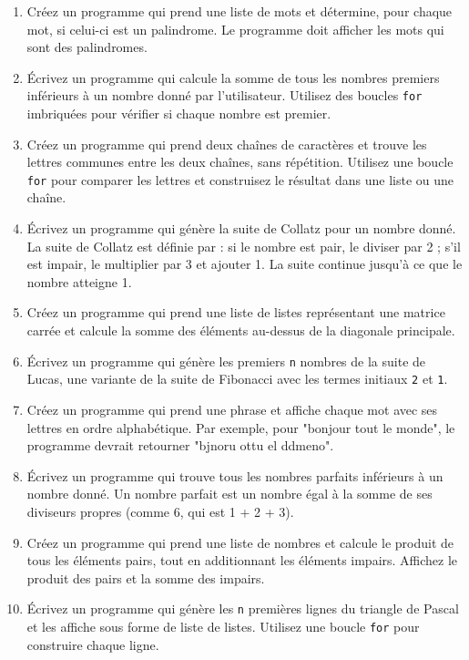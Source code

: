 \begin{enumerate}

    \item Créez un programme qui prend une liste de mots et détermine, pour chaque mot, si celui-ci est un palindrome. Le programme doit afficher les mots qui sont des palindromes.

    \item Écrivez un programme qui calcule la somme de tous les nombres premiers inférieurs à un nombre donné par l'utilisateur. Utilisez des boucles \texttt{for} imbriquées pour vérifier si chaque nombre est premier.

    \item Créez un programme qui prend deux chaînes de caractères et trouve les lettres communes entre les deux chaînes, sans répétition. Utilisez une boucle \texttt{for} pour comparer les lettres et construisez le résultat dans une liste ou une chaîne.

    \item Écrivez un programme qui génère la suite de Collatz pour un nombre donné. La suite de Collatz est définie par : si le nombre est pair, le diviser par 2 ; s'il est impair, le multiplier par 3 et ajouter 1. La suite continue jusqu'à ce que le nombre atteigne 1.

    \item Créez un programme qui prend une liste de listes représentant une matrice carrée et calcule la somme des éléments au-dessus de la diagonale principale.

    \item Écrivez un programme qui génère les premiers \texttt{n} nombres de la suite de Lucas, une variante de la suite de Fibonacci avec les termes initiaux \texttt{2} et \texttt{1}.

    \item Créez un programme qui prend une phrase et affiche chaque mot avec ses lettres en ordre alphabétique. Par exemple, pour "bonjour tout le monde", le programme devrait retourner "bjnoru ottu el ddmeno".

    \item Écrivez un programme qui trouve tous les nombres parfaits inférieurs à un nombre donné. Un nombre parfait est un nombre égal à la somme de ses diviseurs propres (comme 6, qui est 1 + 2 + 3).

    \item Créez un programme qui prend une liste de nombres et calcule le produit de tous les éléments pairs, tout en additionnant les éléments impairs. Affichez le produit des pairs et la somme des impairs.

    \item Écrivez un programme qui génère les \texttt{n} premières lignes du triangle de Pascal et les affiche sous forme de liste de listes. Utilisez une boucle \texttt{for} pour construire chaque ligne.

\end{enumerate}

